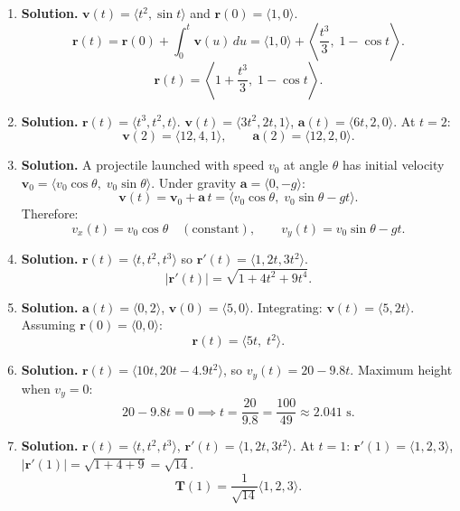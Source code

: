 \begin{enumerate}
\item \textbf{Solution.}
$\mathbf{v}(t)=\langle t^2,\sin t\rangle$ and $\mathbf{r}(0)=\langle 1,0\rangle$.
\[
\mathbf{r}(t)=\mathbf{r}(0)+\int_0^t \mathbf{v}(u)\,du = \langle 1,0\rangle+\left\langle \frac{t^3}{3},\; 1-\cos t\right\rangle.
\]
\[
\boxed{\mathbf{r}(t)=\left\langle 1+\frac{t^3}{3},\; 1-\cos t\right\rangle.}
\]

\item \textbf{Solution.}
$\mathbf{r}(t)=\langle t^3, t^2, t\rangle$.
$\mathbf{v}(t)=\langle 3t^2, 2t, 1\rangle$, $\mathbf{a}(t)=\langle 6t, 2, 0\rangle$.
At $t=2$:
\[
\boxed{\mathbf{v}(2)=\langle 12, 4, 1\rangle, \qquad \mathbf{a}(2)=\langle 12, 2, 0\rangle.}
\]

\item \textbf{Solution.}
A projectile launched with speed $v_0$ at angle $\theta$ has initial velocity $\mathbf{v}_0=\langle v_0\cos\theta,\; v_0\sin\theta\rangle$.
Under gravity $\mathbf{a}=\langle 0,-g\rangle$:
\[
\mathbf{v}(t)=\mathbf{v}_0+\mathbf{a}\,t = \langle v_0\cos\theta,\; v_0\sin\theta - gt\rangle.
\]
Therefore:
\[
\boxed{v_x(t)=v_0\cos\theta \quad(\text{constant}), \qquad v_y(t)=v_0\sin\theta - gt.}
\]

\item \textbf{Solution.}
$\mathbf{r}(t)=\langle t, t^2, t^3\rangle$ so $\mathbf{r}'(t)=\langle 1, 2t, 3t^2\rangle$.
\[
\boxed{|\mathbf{r}'(t)|=\sqrt{1+4t^2+9t^4}.}
\]

\item \textbf{Solution.}
$\mathbf{a}(t)=\langle 0,2\rangle$, $\mathbf{v}(0)=\langle 5,0\rangle$.
Integrating: $\mathbf{v}(t)=\langle 5, 2t\rangle$.
Assuming $\mathbf{r}(0)=\langle 0,0\rangle$:
\[
\boxed{\mathbf{r}(t)=\langle 5t,\; t^2\rangle.}
\]

\item \textbf{Solution.}
$\mathbf{r}(t)=\langle 10t, 20t-4.9t^2\rangle$, so $v_y(t)=20-9.8t$.
Maximum height when $v_y=0$:
\[
20-9.8t=0 \implies \boxed{t=\frac{20}{9.8}=\frac{100}{49}\approx 2.041\text{ s}.}
\]


\item \textbf{Solution.}
$\mathbf{r}(t)=\langle t, t^2, t^3\rangle$, $\mathbf{r}'(t)=\langle 1, 2t, 3t^2\rangle$.
At $t=1$: $\mathbf{r}'(1)=\langle 1,2,3\rangle$, $|\mathbf{r}'(1)|=\sqrt{1+4+9}=\sqrt{14}$.
\[
\boxed{\mathbf{T}(1)=\frac{1}{\sqrt{14}}\langle 1,2,3\rangle.}
\]


\end{enumerate}
